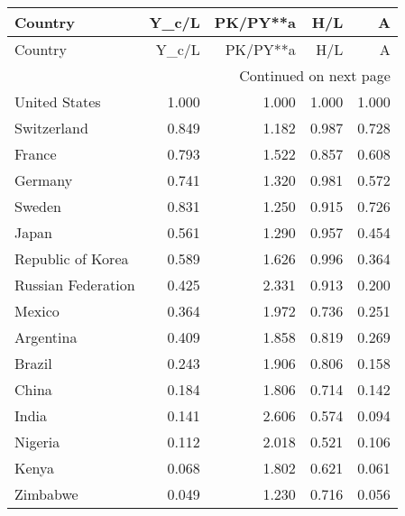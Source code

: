 \begin{longtable}{lrrrr}
\toprule
           Country &  Y\_c/L &  PK/PY**a &   H/L &     A \\
\hline
\midrule
\endfirsthead

\toprule
           Country &  Y\_c/L &  PK/PY**a &   H/L &     A \\
\midrule
\endhead
\midrule
\multicolumn{5}{r}{{Continued on next page}} \\
\midrule
\endfoot

\bottomrule
\endlastfoot
     United States &  1.000 &     1.000 & 1.000 & 1.000 \\
       Switzerland &  0.849 &     1.182 & 0.987 & 0.728 \\
            France &  0.793 &     1.522 & 0.857 & 0.608 \\
           Germany &  0.741 &     1.320 & 0.981 & 0.572 \\
            Sweden &  0.831 &     1.250 & 0.915 & 0.726 \\
             Japan &  0.561 &     1.290 & 0.957 & 0.454 \\
 Republic of Korea &  0.589 &     1.626 & 0.996 & 0.364 \\
Russian Federation &  0.425 &     2.331 & 0.913 & 0.200 \\
            Mexico &  0.364 &     1.972 & 0.736 & 0.251 \\
         Argentina &  0.409 &     1.858 & 0.819 & 0.269 \\
            Brazil &  0.243 &     1.906 & 0.806 & 0.158 \\
             China &  0.184 &     1.806 & 0.714 & 0.142 \\
             India &  0.141 &     2.606 & 0.574 & 0.094 \\
           Nigeria &  0.112 &     2.018 & 0.521 & 0.106 \\
             Kenya &  0.068 &     1.802 & 0.621 & 0.061 \\
          Zimbabwe &  0.049 &     1.230 & 0.716 & 0.056 \\
\end{longtable}